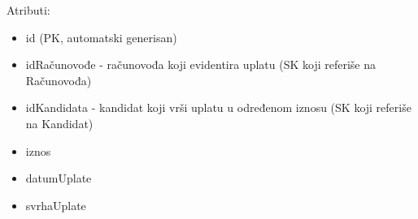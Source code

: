 Atributi:
\begin{itemize}
    \item id (PK, automatski generisan)
    \item idRačunovođe - računovođa koji evidentira uplatu (SK koji referiše na Računovođa)
    \item idKandidata - kandidat koji vrši uplatu u određenom iznosu (SK koji referiše na Kandidat)
    \item iznos
    \item datumUplate
    \item svrhaUplate
    
\end{itemize}


